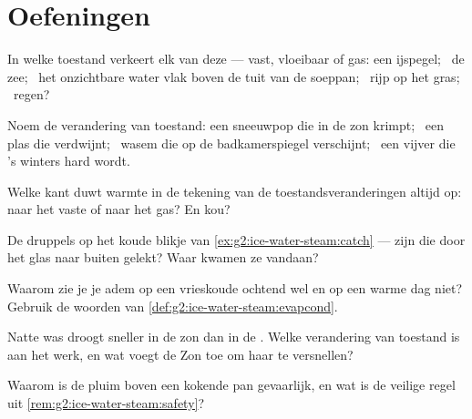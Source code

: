 \section{Oefeningen}

\begin{exercise}[$\star$]\label{exo:g2:ice-water-steam:1}
In welke toestand verkeert elk van deze --- vast, vloeibaar of gas:
een ijspegel; \ de zee; \ het onzichtbare water vlak boven de tuit van
de soeppan; \ rijp op het gras; \ regen?
\end{exercise}

\begin{exercise}[$\star$]\label{exo:g2:ice-water-steam:2}
Noem de verandering van toestand: een sneeuwpop die in de zon krimpt;
\ een plas die verdwijnt; \ wasem die op de badkamerspiegel verschijnt;
\ een vijver die 's winters hard wordt.
\end{exercise}

\begin{exercise}[$\star$]\label{exo:g2:ice-water-steam:3}
Welke kant duwt warmte in de tekening van de toestandsveranderingen
altijd op: naar het vaste of naar het gas? En kou?
\end{exercise}

\begin{exercise}[$\star$]\label{exo:g2:ice-water-steam:4}
De druppels op het koude blikje van \cref{ex:g2:ice-water-steam:catch}
--- zijn die door het glas naar buiten gelekt? Waar kwamen ze vandaan?
\end{exercise}

\begin{exercise}[$\star$]\label{exo:g2:ice-water-steam:5}
Waarom zie je je adem op een vrieskoude ochtend wel en op een warme
dag niet? Gebruik de woorden van \cref{def:g2:ice-water-steam:evapcond}.
\end{exercise}

\begin{exercise}[$\star$]\label{exo:g2:ice-water-steam:6}
Natte was droogt sneller in de zon dan in de . Welke
verandering van toestand is aan het werk, en wat voegt de Zon toe om
haar te versnellen?
\end{exercise}

\begin{exercise}[$\star$]\label{exo:g2:ice-water-steam:7}
Waarom is de pluim boven een kokende pan gevaarlijk, en wat is de
veilige regel uit \cref{rem:g2:ice-water-steam:safety}?
\end{exercise}

